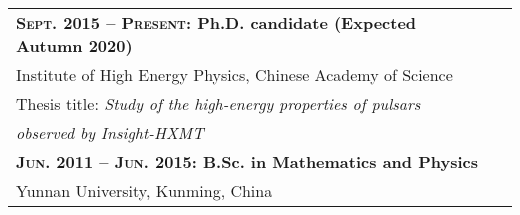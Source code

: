 \documentclass[a4paper,12pt]{article}
\begin{document}
\begin{tabular}{lc}




\textbf{\textsc{Sept. 2015 -- Present}: Ph.D. candidate (Expected Autumn 2020)} \\
\hspace{2cm} Institute of High Energy Physics, Chinese Academy of Science
\\
\hspace{2cm} Thesis title: \textit{Study of the high-energy properties of pulsars}\\
\hspace{2cm} \textit{observed by Insight-HXMT} \\

\textbf{\textsc{Jun. 2011 -- Jun. 2015:} B.Sc. in Mathematics and Physics}\\
\hspace{2cm} Yunnan University, Kunming, China

\end{tabular}
\linebreak
\end{document}
